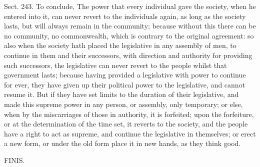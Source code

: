 \documentclass[11pt,openany]{book}
\begin{document}
Sect. 243. To conclude, The power that every individual gave the society, when he entered into it, can never revert to the individuals again, as long as the society lasts, but will always remain in the community; because without this there can be no community, no commonwealth, which is contrary to the original agreement: so also when the society hath placed the legislative in any assembly of men, to continue in them and their successors, with direction and authority for providing such successors, the legislative can never revert to the people whilst that government lasts; because having provided a legislative with power to continue for ever, they have given up their political power to the legislative, and cannot resume it. But if they have set limits to the duration of their legislative, and made this supreme power in any person, or assembly, only temporary; or else, when by the miscarriages of those in authority, it is forfeited; upon the forfeiture, or at the determination of the time set, it reverts to the society, and the people have a right to act as supreme, and continue the legislative in themselves; or erect a new form, or under the old form place it in new hands, as they think good.

FINIS.
\end{document}
